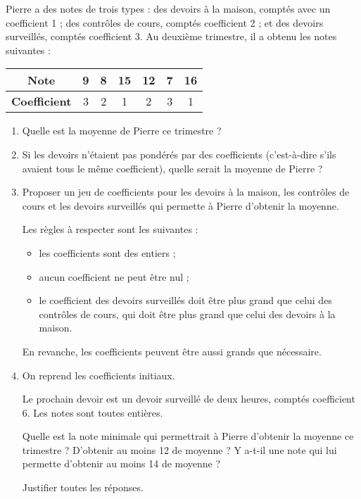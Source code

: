 
\begin{exercice}\label{exoSeconde-0039}

Pierre a des notes de trois types : des devoirs à la maison, comptés
avec un coefficient 1 ; des contrôles de cours, comptés coefficient 2
; et des devoirs surveillés, comptés coefficient 3. Au deuxième
trimestre, il a obtenu les notes suivantes :

\begin{center}
  \begin{tabular}{|c||c|c|c|c|c|c|}
      \hline
    \textbf{Note} & 9 & 8 & 15 & 12 & 7 & 16  \\
    \hline
    \textbf{Coefficient} & 3 & 2 & 1 & 2 & 3 & 1 \\
    \hline
  \end{tabular}      
\end{center}

\begin{enumerate}
\item Quelle est la moyenne de Pierre ce trimestre ?

\item Si les devoirs n'étaient pas pondérés par des coefficients (c'est-à-dire s'ils avaient tous le même coefficient), quelle serait la moyenne de Pierre ?

\item Proposer un jeu de coefficients pour les devoirs à la maison, les contrôles de cours et les devoirs surveillés qui permette à Pierre d'obtenir la moyenne.

  Les règles à respecter sont les suivantes :
  \begin{itemize}
  \item les coefficients sont des entiers ;
  \item aucun coefficient ne peut être nul ;
  \item le coefficient des devoirs surveillés doit être plus grand que
    celui des contrôles de cours, qui doit être plus grand que celui
    des devoirs à la maison.
  \end{itemize}
  En revanche, les coefficients peuvent être aussi grands que nécessaire.    

\item On reprend les coefficients initiaux.

  Le prochain devoir est un devoir surveillé de deux heures, comptés
  coefficient 6. Les notes sont toutes entières.

  Quelle est la note minimale qui permettrait à Pierre d'obtenir la
  moyenne ce trimestre ? D'obtenir au moins 12 de moyenne ? Y a-t-il
  une note qui lui permette d'obtenir au moins 14 de moyenne ? 

  Justifier toutes les réponses.
\end{enumerate}

\end{exercice}
